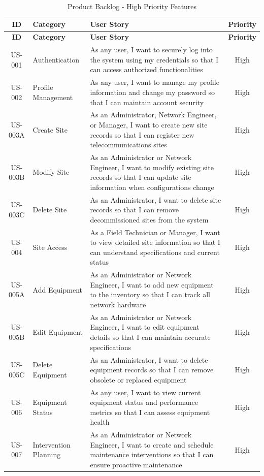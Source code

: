 \begin{longtable}{|c|p{2.8cm}|p{8.2cm}|c|}
\caption{Product Backlog - High Priority Features} \\
\hline
\textbf{ID} & \textbf{Category} & \textbf{User Story} & \textbf{Priority} \\
\hline
\endfirsthead
\hline
\textbf{ID} & \textbf{Category} & \textbf{User Story} & \textbf{Priority} \\
\hline
\endhead

US-001 & Authentication & As any user, I want to securely log into the system using my credentials so that I can access authorized functionalities & High \\
\hline
US-002 & Profile Management & As any user, I want to manage my profile information and change my password so that I can maintain account security & High \\
\hline
US-003A & Create Site & As an Administrator, Network Engineer, or Manager, I want to create new site records so that I can register new telecommunications sites & High \\
\hline
US-003B & Modify Site & As an Administrator or Network Engineer, I want to modify existing site records so that I can update site information when configurations change & High \\
\hline
US-003C & Delete Site & As an Administrator, I want to delete site records so that I can remove decommissioned sites from the system & High \\
\hline
US-004 & Site Access & As a Field Technician or Manager, I want to view detailed site information so that I can understand specifications and current status & High \\
\hline
US-005A & Add Equipment & As an Administrator or Network Engineer, I want to add new equipment to the inventory so that I can track all network hardware & High \\
\hline
US-005B & Edit Equipment & As an Administrator or Network Engineer, I want to edit equipment details so that I can maintain accurate specifications & High \\
\hline
US-005C & Delete Equipment & As an Administrator, I want to delete equipment records so that I can remove obsolete or replaced equipment & High \\
\hline
US-006 & Equipment Status & As any user, I want to view current equipment status and performance metrics so that I can assess equipment health & High \\
\hline
US-007 & Intervention Planning & As an Administrator or Network Engineer, I want to create and schedule maintenance interventions so that I can ensure proactive maintenance & High \\

\end{longtable}

